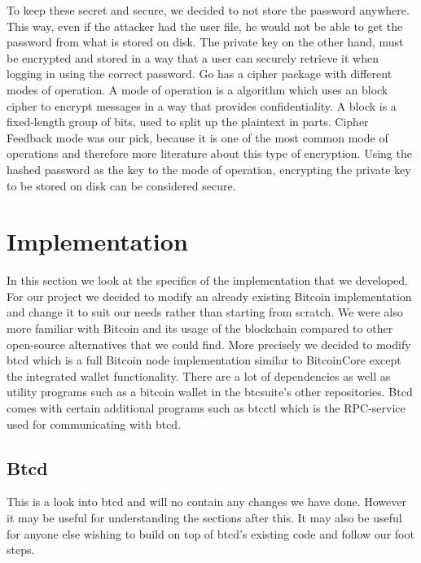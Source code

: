 \documentclass[12pt]{article}
\begin{document}
To keep these secret and secure, we decided to not store the password anywhere. This way, even if the attacker had the user file, he would not be able to get the password from what is stored on disk. The private key on the other hand, must be encrypted and stored in a way that a user can securely retrieve it when logging in using the correct password. Go has a cipher package with different modes of operation. A mode of operation is a algorithm which uses an block cipher to encrypt messages in a way that provides confidentiality\cite{fergusonblock}. A block is a fixed-length group of bits, used to split up the plaintext in parts. Cipher Feedback mode was our pick, because it is one of the most common mode of operations and therefore more literature about this type of encryption. Using the hashed password as the key to the mode of operation, encrypting the private key to be stored on disk can be considered secure. 

\section{Implementation}
In this section we look at the specifics of the implementation that we developed. For our project we decided to modify an already existing Bitcoin implementation and change it to suit our needs rather than starting from scratch. We were also more familiar with Bitcoin and its usage of the blockchain compared to other open-source alternatives that we could find. More precisely we decided to modify btcd\cite{btcsuite2015} which is a full Bitcoin node implementation similar to BitcoinCore except the integrated wallet functionality. There are a lot of dependencies as well as utility programs such as a bitcoin wallet in the btcsuite's other repositories. Btcd comes with certain additional programs such as btcctl which is the RPC-service used for communicating with btcd. 

\subsection{Btcd}
This is a look into btcd and will no contain any changes we have done. However it may be useful for understanding the sections after this. It may also be useful for anyone else wishing to build on top of btcd's existing code and follow our foot steps.
\end{document}

